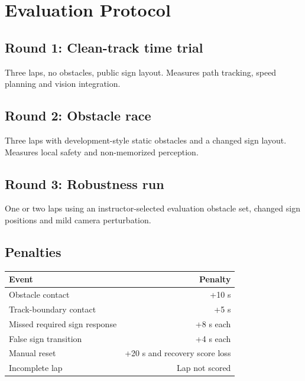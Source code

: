 \documentclass[11pt,a4paper]{article}
\begin{document}
\section{Evaluation Protocol}
\subsection*{Round 1: Clean-track time trial}
Three laps, no obstacles, public sign layout. Measures path tracking, speed planning and vision integration.

\subsection*{Round 2: Obstacle race}
Three laps with development-style static obstacles and a changed sign layout. Measures local safety and non-memorized perception.

\subsection*{Round 3: Robustness run}
One or two laps using an instructor-selected evaluation obstacle set, changed sign positions and mild camera perturbation.

\subsection*{Penalties}
\begin{center}
\begin{tabular}{lr}
\toprule
Event & Penalty\\
\midrule
Obstacle contact & +10 s\\
Track-boundary contact & +5 s\\
Missed required sign response & +8 s each\\
False sign transition & +4 s each\\
Manual reset & +20 s and recovery score loss\\
Incomplete lap & Lap not scored\\
\bottomrule
\end{tabular}
\end{center}
\end{document}

